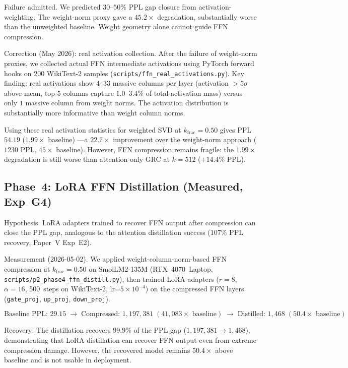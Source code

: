 \documentclass[11pt]{article}
\begin{document}
Failure admitted.  We predicted $30$--$50\%$ PPL gap closure from
activation-weighting.  The weight-norm proxy gave a $45.2{\times}$ degradation, substantially worse than the unweighted baseline.  Weight geometry alone
cannot guide FFN compression.

Correction (May 2026): real activation collection.  After the failure
of weight-norm proxies, we collected actual FFN intermediate activations using
PyTorch forward hooks on 200 WikiText-2 samples
(\texttt{scripts/ffn\_real\_activations.py}).  Key finding: real activations
show $4$--$33$ massive columns per layer (activation $>5\sigma$ above mean,
top-5 columns capture $1.0$--$3.4\%$ of total activation mass) versus only
$1$ massive column from weight norms.  The activation distribution is
substantially more informative than weight column norms.

Using these real activation statistics for weighted SVD at
$k_\text{frac}{=}0.50$ gives PPL $54.19$
($1.99{\times}$ baseline) ---a $22.7{\times}$ improvement
over the weight-norm approach ($1230$ PPL, $45{\times}$ baseline).  However,
FFN compression remains fragile: the $1.99{\times}$ degradation is still
worse than attention-only GRC at $k{=}512$ ($+14.4\%$ PPL).

\subsection{Phase~4: LoRA FFN Distillation (Measured, Exp~G4)}

Hypothesis.  LoRA adapters trained to recover FFN output after
compression can close the PPL gap, analogous to the attention
distillation success ($107\%$ PPL recovery, Paper~V Exp~E2).

Measurement (2026-05-02).  We applied weight-column-norm-based
FFN compression at $k_\text{frac}{=}0.50$ on SmolLM2-135M (RTX~4070~Laptop,
\texttt{scripts/p2\_phase4\_ffn\_distill.py}), then trained LoRA adapters
($r{=}8$, $\alpha{=}16$, 500~steps on WikiText-2, lr=$5{\times}10^{-4}$)
on the compressed FFN layers (\texttt{gate\_proj}, \texttt{up\_proj},
\texttt{down\_proj}).

\[
\text{Baseline PPL: } 29.15 \;\rightarrow\;
\text{Compressed: } 1{,}197{,}381 \; (41{,}083{\times}\text{ baseline}) \;\rightarrow\;
\text{Distilled: } 1{,468} \; (50.4{\times}\text{ baseline})
\]

Recovery:  The distillation recovers $99.9\%$ of the
PPL gap ($1{,}197{,}381\to 1{,}468$), demonstrating that LoRA distillation
can recover FFN output even from extreme compression damage.
However, the recovered model remains $50.4{\times}$ above baseline
and is not usable in deployment.
\end{document}
